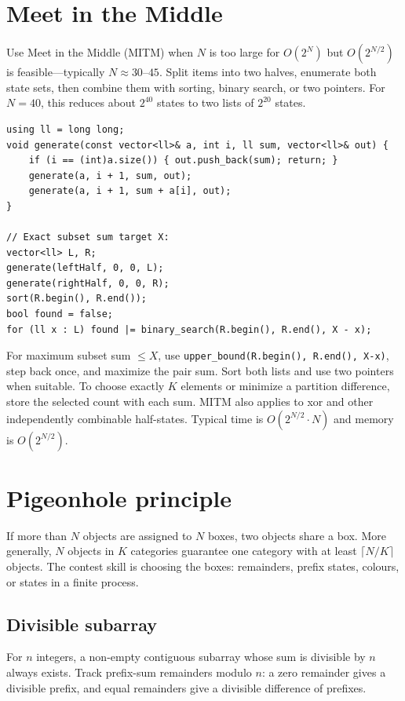 \section{Meet in the Middle}

Use Meet in the Middle (MITM) when $N$ is too large for $O(2^N)$ but $O(2^{N/2})$ is feasible---typically $N \approx 30$--$45$. Split items into two halves, enumerate both state sets, then combine them with sorting, binary search, or two pointers. For $N=40$, this reduces about $2^{40}$ states to two lists of $2^{20}$ states.

\begin{lstlisting}
using ll = long long;
void generate(const vector<ll>& a, int i, ll sum, vector<ll>& out) {
    if (i == (int)a.size()) { out.push_back(sum); return; }
    generate(a, i + 1, sum, out);
    generate(a, i + 1, sum + a[i], out);
}

// Exact subset sum target X:
vector<ll> L, R;
generate(leftHalf, 0, 0, L);
generate(rightHalf, 0, 0, R);
sort(R.begin(), R.end());
bool found = false;
for (ll x : L) found |= binary_search(R.begin(), R.end(), X - x);
\end{lstlisting}

For maximum subset sum $\leq X$, use \texttt{upper\_bound(R.begin(), R.end(), X-x)}, step back once, and maximize the pair sum. Sort both lists and use two pointers when suitable. To choose exactly $K$ elements or minimize a partition difference, store the selected count with each sum. MITM also applies to xor and other independently combinable half-states. Typical time is $O(2^{N/2} \cdot N)$ and memory is $O(2^{N/2})$.

\section{Pigeonhole principle}

If more than $N$ objects are assigned to $N$ boxes, two objects share a box. More generally, $N$ objects in $K$ categories guarantee one category with at least $\lceil N/K \rceil$ objects. The contest skill is choosing the boxes: remainders, prefix states, colours, or states in a finite process.

\subsection{Divisible subarray}
For $n$ integers, a non-empty contiguous subarray whose sum is divisible by $n$ always exists. Track prefix-sum remainders modulo $n$: a zero remainder gives a divisible prefix, and equal remainders give a divisible difference of prefixes.

